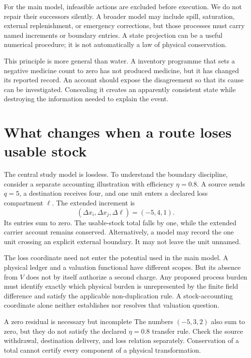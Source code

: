 For the main model, infeasible actions are excluded before execution. We do not repair their successors silently. A broader model may include spill, saturation, external replenishment, or emergency corrections, but those processes must carry named increments or boundary entries. A state projection can be a useful numerical procedure; it is not automatically a law of physical conservation.

This principle is more general than water. A inventory programme that sets a negative medicine count to zero has not produced medicine, but it has changed its reported record. An account should expose the disagreement so that its cause can be investigated. Concealing it creates an apparently consistent state while destroying the information needed to explain the event.

\section{What changes when a route loses usable stock}
The central study model is lossless. To understand the boundary discipline, consider a separate accounting illustration with efficiency \(\eta=0.8\). A source sends \(q=5\), a destination receives four, and one unit enters a declared loss compartment \(\ell\). The extended increment is
\begin{equation}
 (\Delta x_i,\Delta x_j,\Delta\ell)=(-5,4,1).
\end{equation}
Its entries sum to zero. The usable-stock total falls by one, while the extended carrier account remains conserved. Alternatively, a model may record the one unit crossing an explicit external boundary. It may not leave the unit unnamed.

The loss coordinate need not enter the potential used in the main model. A physical ledger and a valuation functional have different scopes. But its absence from \(V\) does not by itself authorize a second charge. Any proposed process burden must identify exactly which physical burden is unrepresented by the finite field difference and satisfy the applicable non-duplication rule. A stock-accounting coordinate alone neither establishes nor resolves that valuation question.

\begin{cautionbox}{A zero residual is necessary but incomplete}
The numbers \((-5,3,2)\) also sum to zero, but they do not satisfy the declared \(\eta=0.8\) transfer rule. Check the source withdrawal, destination delivery, and loss relation separately. Conservation of a total cannot certify every component of a physical transformation.
\end{cautionbox}

